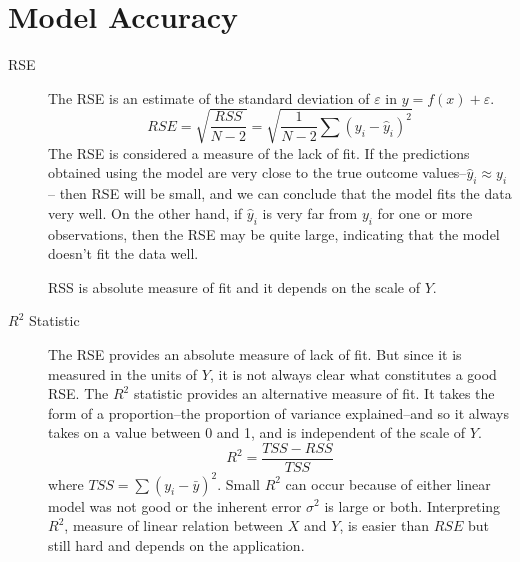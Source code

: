 \section{Model Accuracy}
\label{sec:Model_Accuracy_Interview}

\begin{description}
\item [RSE]
The RSE is an estimate of the standard deviation of $\varepsilon$ in $y = f(x) + \varepsilon$. 
\begin{equation}
RSE = \sqrt{\frac{RSS}{N-2} } = \sqrt{\frac{1}{N-2}  \sum(y_i - \hat y_i)^2}
\end{equation}
The RSE is considered a measure of the lack of fit.
If the predictions obtained using the model are very 
close to the true outcome values--$\hat y_i \approx y_i$-- 
then RSE will be small, and we can conclude that the model fits the data very well. 
On the other hand, if $\hat y_i$ is very far from $y_i$ 
for one or more observations, 
then the RSE may be quite large, indicating that the 
model doesn’t fit the data well.

RSS is absolute measure of fit and it depends on
the scale of $Y$. 


\item [$R^2$ Statistic]
The RSE provides an absolute measure of lack of fit. But since it is 
measured in the units of $Y$, it is not always clear what constitutes a 
good RSE. The $R^2$ statistic provides an alternative measure of fit. 
It takes the form of a proportion--the proportion of variance explained--and 
so it always takes on a value between 0 and 1, and is independent of the scale of $Y$.
\begin{equation}
R^2 = \frac{TSS - RSS}{TSS}
\end{equation}
where $TSS = \sum(y_i - \bar y)^2$.
Small $R^2$ can occur because of either 
linear model was not good or the inherent error $\sigma^2$
is large or both. Interpreting $R^2$, measure of linear relation between 
$X$ and $Y$, is easier than
$RSE$ but still hard and depends on the application.


\end{description}
